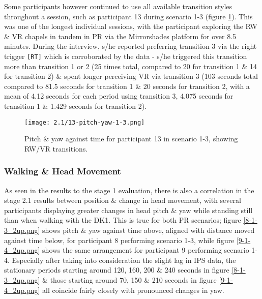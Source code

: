 Some participants however continued to use all available transition styles throughout a session, such as participant 13 during scenario 1-3 (figure \ref{13-pitch-yaw-1-3.png}). This was one of the longest individual sessions, with the participant exploring the RW \& VR chapels in tandem in PR via the Mirrorshades platform for over 8.5 minutes. During the interview, s/he reported preferring transition 3 via the right trigger \texttt{[RT]} which is corroborated by the data - s/he triggered this transition more than transition 1 or 2 (25 times total, compared to 20 for transition 1 \& 14 for transition 2) \& spent longer perceiving VR via transition 3 (103 seconds total compared to 81.5 seconds for transition 1 \& 20 seconds for transition 2, with a mean of 4.12 seconds for each period using transition 3, 4.075 seconds for transition 1 \& 1.429 seconds for transition 2).

\begin{figure}[h]
	\begin{center}
	\texttt{[image: 2.1/13-pitch-yaw-1-3.png]}
	\caption{Pitch \& yaw against time for participant 13 in scenario 1-3, showing RW/VR transitions.}
	\label{13-pitch-yaw-1-3.png}
	\end{center}
\end{figure}


\subsubsection{Walking \& Head Movement}

As seen in the results to the stage 1 evaluation, there is also a correlation in the stage 2.1 results between position \& change in head movement, with several participants displaying greater changes in head pitch \& yaw while standing still than when walking with the DK1. This is true for both PR scenarios; figure \ref{8-1-3_2up.png} shows pitch \& yaw against time above, aligned with distance moved against time below, for participant 8 performing scenario 1-3, while figure \ref{9-1-4_2up.png} shows the same arrangement for participant 9 performing scenario 1-4. Especially after taking into consideration the slight lag in IPS data, the stationary periods starting around 120, 160, 200 \& 240 seconds in figure \ref{8-1-3_2up.png} \& those starting around 70, 150 \& 210 seconds in figure \ref{9-1-4_2up.png} all coincide fairly closely with pronounced changes in yaw.

